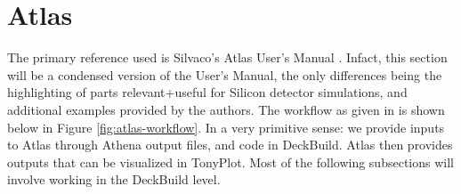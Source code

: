 \documentclass[11pt]{article}
\begin{document}
\section{Atlas}
The primary reference used is Silvaco's Atlas User's Manual \cite{silvaco-atlas}. Infact, this section will be a condensed version of the User's Manual, the only differences being the highlighting of parts relevant+useful for Silicon detector simulations, and additional examples provided by the authors. The workflow as given in \cite{silvaco-atlas} is shown below in Figure \ref{fig:atlas-workflow}. In a very primitive sense: we provide inputs to Atlas through Athena output files, and code in DeckBuild. Atlas then provides outputs that can be visualized in TonyPlot. Most of the following subsections will involve working in the DeckBuild level.
\end{document}
